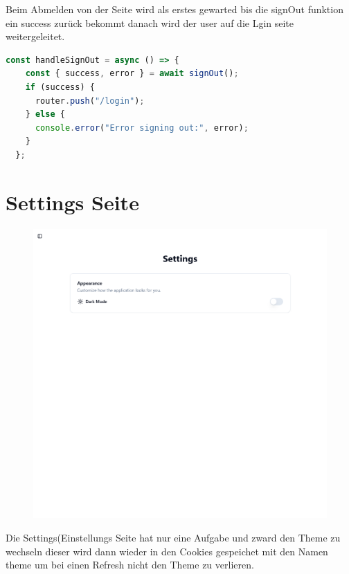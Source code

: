 \begin{inhalt}
\clearpage

Beim Abmelden von der Seite wird als erstes  gewarted bis die signOut funktion ein success zurück bekommt danach wird der user auf die Lgin seite weitergeleitet. 

\begin{lstlisting}[language=TypeScript]
  const handleSignOut = async () => {
    const { success, error } = await signOut();
    if (success) {
      router.push("/login");
    } else {
      console.error("Error signing out:", error);
    }
  };
\end{lstlisting}


\newpage

\section{Settings Seite}

\begin{figure}[!htb]
\centering
\includegraphics[width=1\textwidth]{files/Thomas/pics/Website/Settings/settings-screen.png}
\caption[Bildbezeichnung für Abbildungsverzeichnis]{}
\label{fig:gehaeuse_internet_bild}
\end{figure}

\clearpage

Die Settings(Einstellungs Seite hat nur eine Aufgabe und zward den Theme zu wechseln dieser wird dann wieder in den Cookies gespeichet mit den Namen theme um bei einen Refresh nicht den Theme zu verlieren.


\end{inhalt}
